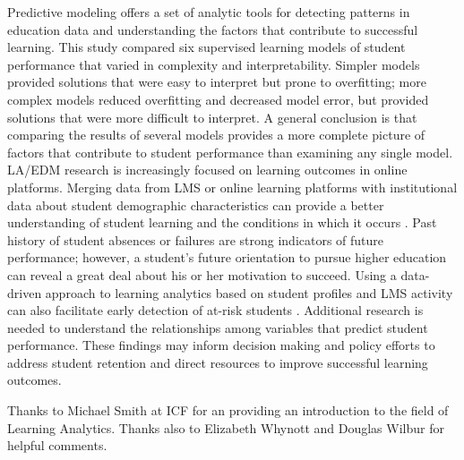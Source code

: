 \documentclass[sigconf]{acmart}
\begin{document}
Predictive modeling offers a set of analytic tools for detecting patterns in 
education data and understanding the factors that contribute to successful
learning. This study compared six supervised learning models of student 
performance that varied in complexity and interpretability. Simpler models 
provided solutions that were easy to interpret but prone to overfitting;
more complex models reduced overfitting and decreased model error, but 
provided solutions that were more difficult to interpret. A general conclusion 
is that comparing the results of several models provides a more complete 
picture of factors that contribute to student performance than examining any 
single model. LA/EDM research is increasingly focused on learning outcomes in 
online platforms. Merging data from LMS or online learning platforms with 
institutional data about student demographic characteristics can provide a 
better understanding of student learning and the conditions in which it 
occurs \cite{hora19, siemens12}. Past history of student absences or failures 
are strong indicators of future performance; however, a student's future 
orientation to pursue higher education can reveal a great deal about his 
or her motivation to succeed. Using a data-driven approach to learning 
analytics based on student profiles and LMS activity can also facilitate early 
detection of at-risk students \cite{Dekkar09}. Additional research is needed to 
understand the relationships among variables that predict student performance. 
These findings may inform decision making and policy efforts to address student 
retention and direct resources to improve successful learning outcomes.

\begin{acks}

Thanks to Michael Smith at ICF for an providing an introduction to the field
of Learning Analytics. Thanks also to Elizabeth Whynott and Douglas Wilbur 
for helpful comments. 

\end{acks}


 
\end{document}
